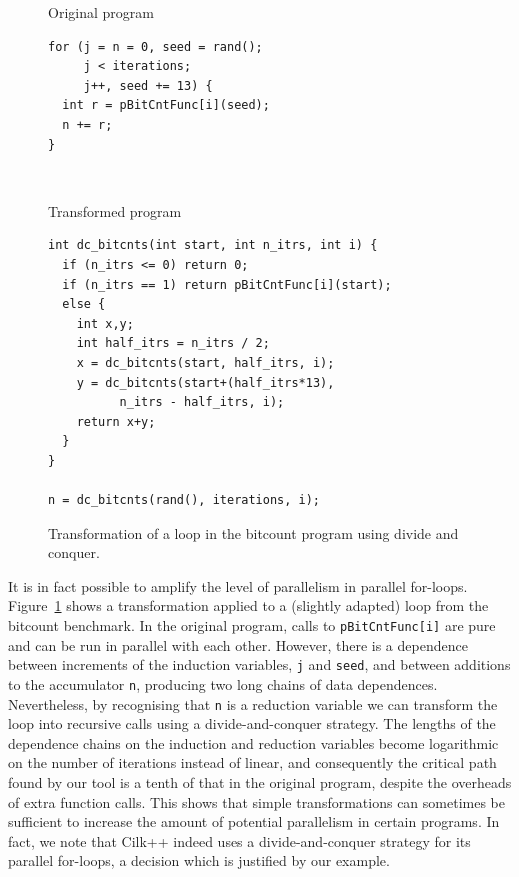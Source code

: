 \begin{figure}
  \centering
  \small
  \begin{SubFloat}{\label{dnc:orig}Original program}
    \begin{minipage}{3in}
      \begin{verbatim}
for (j = n = 0, seed = rand();
     j < iterations;
     j++, seed += 13) {
  int r = pBitCntFunc[i](seed);
  n += r;
}
      \end{verbatim}
    \end{minipage}%
  \end{SubFloat}%
\\
  \begin{SubFloat}{\label{dnc:trans}Transformed program}
    \begin{minipage}{3in}
      \begin{verbatim}
int dc_bitcnts(int start, int n_itrs, int i) {
  if (n_itrs <= 0) return 0;
  if (n_itrs == 1) return pBitCntFunc[i](start);
  else {
    int x,y;
    int half_itrs = n_itrs / 2;
    x = dc_bitcnts(start, half_itrs, i);
    y = dc_bitcnts(start+(half_itrs*13),
          n_itrs - half_itrs, i);
    return x+y;
  }
}

n = dc_bitcnts(rand(), iterations, i);
      \end{verbatim}
    \end{minipage}%
  \end{SubFloat}%
  \caption{Transformation of a loop in the \textsf{bitcount} program using divide and conquer.}
  \label{dnc}
\end{figure}

It is in fact possible to amplify the level of parallelism in parallel for-loops.
Figure~\ref{dnc} shows a transformation applied to a (slightly adapted) loop from the \textsf{bitcount} benchmark.
In the original program, calls to \texttt{pBitCntFunc[i]} are pure and can be run in parallel with each other.
However, there is a dependence between increments of the induction variables, \texttt{j} and \texttt{seed}, and between additions to the accumulator \texttt{n}, producing two long chains of data dependences.
Nevertheless, by recognising that \texttt{n} is a reduction variable we can transform the loop into recursive calls using a divide-and-conquer strategy.
The lengths of the dependence chains on the induction and reduction variables become logarithmic on the number of iterations instead of linear, and consequently the critical path found by our tool is a tenth of that in the original program, despite the overheads of extra function calls.
This shows that simple transformations can sometimes be sufficient to increase the amount of potential parallelism in certain programs.
In fact, we note that Cilk++ indeed uses a divide-and-conquer strategy for its parallel for-loops, a decision which is justified by our example.


